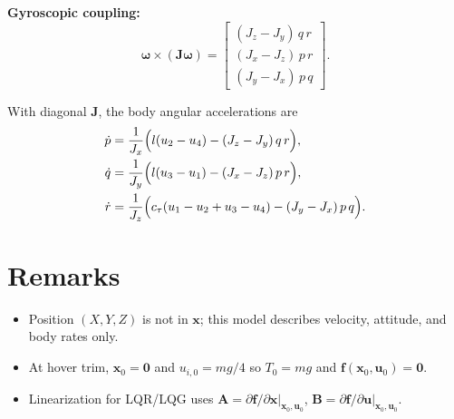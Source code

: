 \documentclass[11pt]{article}
\begin{document}
\textbf{Gyroscopic coupling:}
\begin{equation}
  \bm{\omega} \times (\bm{J}\bm{\omega})
  =
  \begin{bmatrix}
    (J_z - J_y)\,q\,r \\
    (J_x - J_z)\,p\,r \\
    (J_y - J_x)\,p\,q
  \end{bmatrix}.
\end{equation}

With diagonal $\bm{J}$, the body angular accelerations are
\begin{align}
  \dot{p} &= \frac{1}{J_x}\Bigl( l(u_2 - u_4) - (J_z - J_y)\,q\,r \Bigr), \\
  \dot{q} &= \frac{1}{J_y}\Bigl( l(u_3 - u_1) - (J_x - J_z)\,p\,r \Bigr), \\
  \dot{r} &= \frac{1}{J_z}\Bigl( c_\tau(u_1 - u_2 + u_3 - u_4) - (J_y - J_x)\,p\,q \Bigr).
\end{align}

\section*{Remarks}

\begin{itemize}
  \item Position $(X,Y,Z)$ is not in $\bm{x}$; this model describes velocity, attitude, and body rates only.
  \item At hover trim, $\bm{x}_0 = \bm{0}$ and $u_{i,0} = mg/4$ so $T_0 = mg$ and $\bm{f}(\bm{x}_0,\bm{u}_0)=\bm{0}$.
  \item Linearization for LQR/LQG uses
  $\bm{A} = \partial \bm{f}/\partial \bm{x}|_{\bm{x}_0,\bm{u}_0}$,
  $\bm{B} = \partial \bm{f}/\partial \bm{u}|_{\bm{x}_0,\bm{u}_0}$.
\end{itemize}
\end{document}
